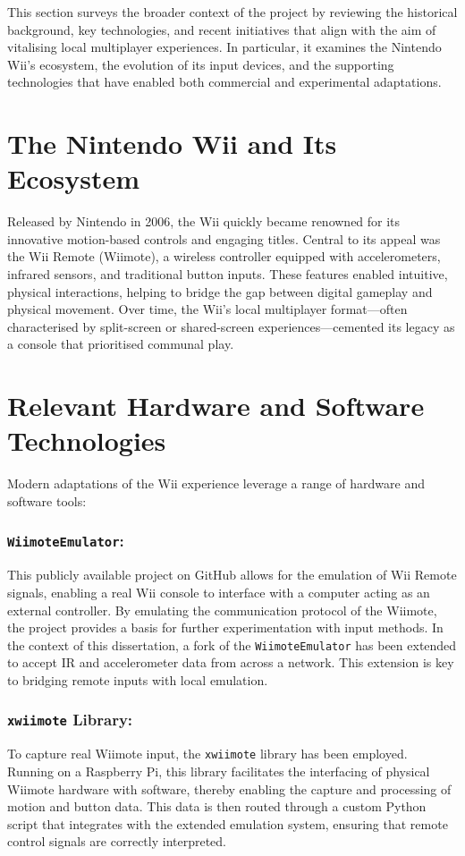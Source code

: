 \label{chapter:context}

This section surveys the broader context of the project by reviewing the historical background, key technologies, and recent initiatives that align with the aim of vitalising local multiplayer experiences. In particular, it examines the Nintendo Wii’s ecosystem, the evolution of its input devices, and the supporting technologies that have enabled both commercial and experimental adaptations.

\section{The Nintendo Wii and Its Ecosystem}
Released by Nintendo in 2006, the Wii quickly became renowned for its innovative motion-based controls and engaging titles. Central to its appeal was the Wii Remote (Wiimote), a wireless controller equipped with accelerometers, infrared sensors, and traditional button inputs. These features enabled intuitive, physical interactions, helping to bridge the gap between digital gameplay and physical movement. Over time, the Wii’s local multiplayer format—often characterised by split-screen or shared-screen experiences—cemented its legacy as a console that prioritised communal play.

\section{Relevant Hardware and Software Technologies}
Modern adaptations of the Wii experience leverage a range of hardware and software tools:

\subsubsection{\texttt{WiimoteEmulator}\cite{wiimote_emulator}:} This publicly available project on GitHub allows for the emulation of Wii Remote signals, enabling a real Wii console to interface with a computer acting as an external controller. By emulating the communication protocol of the Wiimote, the project provides a basis for further experimentation with input methods. In the context of this dissertation, a fork of the \texttt{WiimoteEmulator} has been extended to accept IR and accelerometer data from across a network. This extension is key to bridging remote inputs with local emulation.

\subsubsection{\texttt{xwiimote} Library\cite{xwiimote}:} To capture real Wiimote input, the \texttt{xwiimote} library has been employed. Running on a Raspberry Pi, this library facilitates the interfacing of physical Wiimote hardware with software, thereby enabling the capture and processing of motion and button data. This data is then routed through a custom Python script that integrates with the extended emulation system, ensuring that remote control signals are correctly interpreted.

